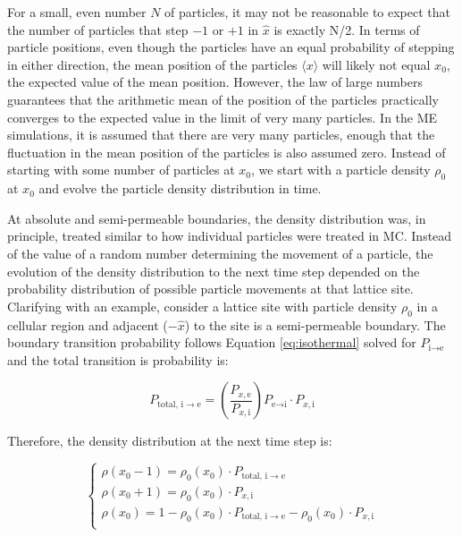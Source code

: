 	For a small, even number $ N $ of particles, it may not be reasonable to expect that the number of particles that step $ -1 $ or $ +1 $ in $ \hat{x} $ is exactly N/2. In terms of particle positions, even though the particles have an equal probability of stepping in either direction, the mean position of the particles $ \langle x \rangle $ will likely not equal $ x_0 $, the expected value of the mean position. However, the law of large numbers guarantees that the arithmetic mean of the position of the particles practically converges to the expected value in the limit of very many particles. In the ME simulations, it is assumed that there are very many particles, enough that the fluctuation in the mean position of the particles is also assumed zero. Instead of starting with some number of particles at $ x_0 $, we start with a particle density $ \rho_0 $ at $ x_0 $ and evolve the particle density distribution in time. %
	
	At absolute and semi-permeable boundaries, the density distribution was, in principle, treated similar to how individual particles were treated in MC. Instead of the value of a random number determining the movement of a particle, the evolution of the density distribution to the next time step depended on the probability distribution of possible particle movements at that lattice site. Clarifying with an example, consider a lattice site with particle density $ \rho_0 $ in a cellular region and adjacent ($ -\hat{x} $) to the site is a semi-permeable boundary. The boundary transition probability follows Equation \ref{eq:isothermal} solved for $ P_{\textrm{i} \rightarrow \textrm{e}} $ and the total transition is probability is:
	
	\begin{equation}
		P_{\textrm{total},\, \textrm{i} \rightarrow \textrm{e}} = \left( \dfrac{P_{x,\textrm{e}}}{P_{x,\textrm{i}}}\right)  P_{\textrm{e}\rightarrow \textrm{i}} \cdot P_{x,\textrm{i}}
	\end{equation}	
	
	Therefore, the density distribution at the next time step is:
	
	\[   \left\{
	\begin{array}{l}
	      \rho(x_0 - 1) =   \rho_0(x_0) \cdot P_{\textrm{total},\, \textrm{i} \rightarrow \textrm{e}} \\
	      \rho(x_0 + 1) =   \rho_0(x_0) \cdot P_{x,\textrm{i}} \\
	      \rho(x_0) =   1 - \rho_0(x_0) \cdot P_{\textrm{total},\, \textrm{i} \rightarrow \textrm{e}} -  \rho_0(x_0) \cdot P_{x,\textrm{i}}\\
	\end{array} 
	\right. \]	
	

